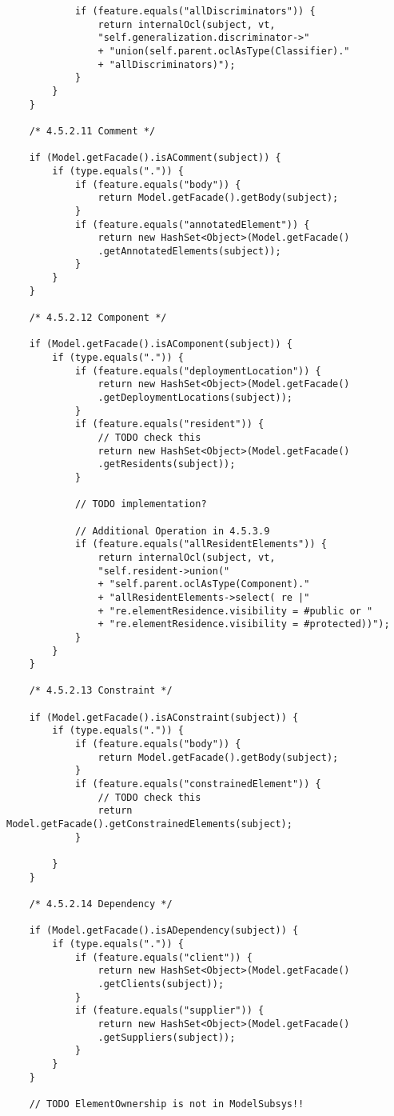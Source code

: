 \begin{mdframed}
\begin{lstlisting}
			if (feature.equals("allDiscriminators")) {
				return internalOcl(subject, vt,
				"self.generalization.discriminator->"
				+ "union(self.parent.oclAsType(Classifier)."
				+ "allDiscriminators)");
			}
		}
	}
	
	/* 4.5.2.11 Comment */  
	
	if (Model.getFacade().isAComment(subject)) {
		if (type.equals(".")) {
			if (feature.equals("body")) {
				return Model.getFacade().getBody(subject);
			}
			if (feature.equals("annotatedElement")) {
				return new HashSet<Object>(Model.getFacade()
				.getAnnotatedElements(subject));
			}
		}
	}
	
	/* 4.5.2.12 Component */  
	
	if (Model.getFacade().isAComponent(subject)) {
		if (type.equals(".")) {
			if (feature.equals("deploymentLocation")) {
				return new HashSet<Object>(Model.getFacade()
				.getDeploymentLocations(subject));
			}
			if (feature.equals("resident")) {
				// TODO check this
				return new HashSet<Object>(Model.getFacade()
				.getResidents(subject));
			}
			
			// TODO implementation?
			
			// Additional Operation in 4.5.3.9                
			if (feature.equals("allResidentElements")) {
				return internalOcl(subject, vt,
				"self.resident->union("
				+ "self.parent.oclAsType(Component)."
				+ "allResidentElements->select( re |"
				+ "re.elementResidence.visibility = #public or "
				+ "re.elementResidence.visibility = #protected))");
			}
		}
	}
	
	/* 4.5.2.13 Constraint */  
	
	if (Model.getFacade().isAConstraint(subject)) {
		if (type.equals(".")) {
			if (feature.equals("body")) {
				return Model.getFacade().getBody(subject);
			}
			if (feature.equals("constrainedElement")) {
				// TODO check this
				return Model.getFacade().getConstrainedElements(subject);
			}
			
		}
	}        
	
	/* 4.5.2.14 Dependency */  
	
	if (Model.getFacade().isADependency(subject)) {
		if (type.equals(".")) {
			if (feature.equals("client")) {
				return new HashSet<Object>(Model.getFacade()
				.getClients(subject));
			}
			if (feature.equals("supplier")) {
				return new HashSet<Object>(Model.getFacade()
				.getSuppliers(subject));
			}
		}
	}        
	
	// TODO ElementOwnership is not in ModelSubsys!!
	

\end{lstlisting}
\end{mdframed}
